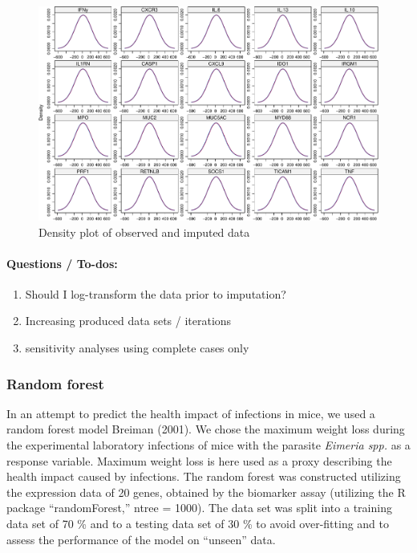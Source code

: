 \documentclass[
]{article}
\providecommand{\tightlist}{%
  \setlength{\itemsep}{0pt}\setlength{\parskip}{0pt}}
\begin{document}
\begin{figure}[th]
\includegraphics[width=1\linewidth]{TAC_report_2022_files/figure-latex/fig2-1} \caption{Density plot of observed and imputed data}\label{fig:fig2}
\end{figure}

\hypertarget{questions-to-dos}{%
\paragraph{Questions / To-dos:}\label{questions-to-dos}}

\begin{enumerate}
\def\labelenumi{\arabic{enumi}.}
\tightlist
\item
  Should I log-transform the data prior to imputation?
\item
  Increasing produced data sets / iterations
\item
  sensitivity analyses using complete cases only
\end{enumerate}

\hypertarget{random-forest}{%
\subsubsection{Random forest}\label{random-forest}}

In an attempt to predict the health impact of infections in mice, we
used a random forest model Breiman (2001). We chose the maximum weight
loss during the experimental laboratory infections of mice with the
parasite \emph{Eimeria spp.} as a response variable. Maximum weight loss
is here used as a proxy describing the health impact caused by
infections. The random forest was constructed utilizing the expression
data of 20 genes, obtained by the biomarker assay (utilizing the R
package ``randomForest,'' ntree = 1000). The data set was split into a
training data set of 70 \% and to a testing data set of 30 \% to avoid
over-fitting and to assess the performance of the model on ``unseen''
data.
\end{document}
